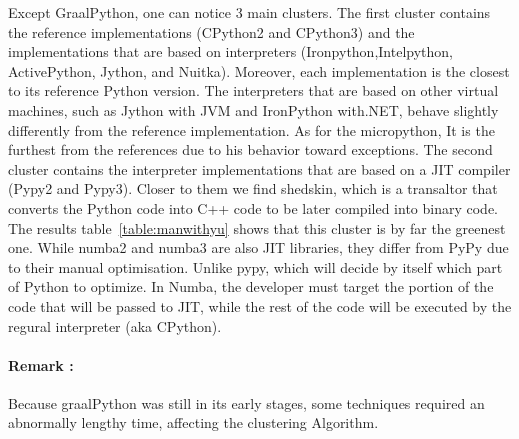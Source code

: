 Except GraalPython, one can notice 3 main clusters.
The first cluster contains the reference implementations (CPython2 and CPython3) and the implementations that are based on interpreters (Ironpython,Intelpython, ActivePython, Jython, and Nuitka). Moreover, each implementation is the closest to its reference Python version. The interpreters that are based on other virtual machines, such as Jython with JVM and IronPython with.NET, behave slightly differently from the reference implementation. As for the micropython, It is the furthest from the references due to his behavior toward exceptions.
The second cluster contains the interpreter implementations that are based on a JIT compiler (Pypy2 and Pypy3). Closer to them we find shedskin, which is a transaltor that converts the Python code into C++ code to be later compiled into binary code.
The results table~\ref{table:manwithyu} shows that this cluster is by far the greenest one.
While numba2 and numba3 are also JIT libraries, they differ from PyPy due to their manual optimisation. Unlike pypy, which will decide by itself which part of Python to optimize. In Numba, the developer must target the portion of the code that will be passed to JIT, while the rest of the code will be executed by the regural interpreter (aka CPython).

\paragraph{Remark :}
Because graalPython was still in its early stages, some techniques required an abnormally lengthy time, affecting the clustering Algorithm.

